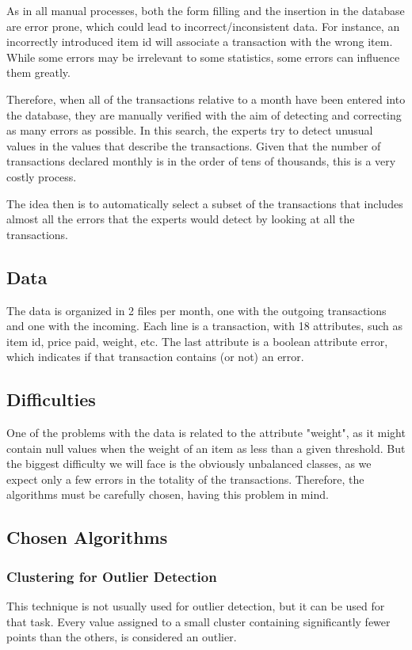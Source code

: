 \documentclass{llncs}
\begin{document}
As in all manual processes, both the form filling and the insertion in the database are error prone, which could lead to incorrect/inconsistent data. For instance, an incorrectly introduced item id will associate a transaction with the wrong item. While some errors may be irrelevant to some statistics, some errors can influence them greatly.

Therefore, when all of the transactions relative to a month have been entered into the database, they are manually verified with the aim of detecting and correcting as many errors as possible. In this search, the experts try to detect unusual values in the values that describe the transactions.
Given that the number of transactions declared monthly is in the order of tens of thousands, this is a very costly process.

The idea then is to automatically select a subset of the transactions that includes almost all the errors that the experts would detect by looking at all the transactions.

\subsection{Data}

The data is organized in 2 files per month, one with the outgoing transactions and one with the incoming. Each line is a transaction, with 18 attributes, such as item id, price paid, weight, etc. The last attribute is a boolean attribute error, which indicates if that transaction contains (or not) an error.

\subsection{Difficulties}

One of the problems with the data is related to the attribute "weight", as it might contain null values when the weight of an item as less than a given threshold. But the biggest difficulty we will face is
the obviously unbalanced classes, as we expect only a few errors in the totality of the transactions. Therefore, the algorithms must be carefully chosen, having this problem in mind.

\subsection{Chosen Algorithms}

\subsubsection{Clustering for Outlier Detection}
This technique is not usually used for outlier detection, but it can be used for that task.
Every value assigned to a small cluster containing significantly fewer points than the others, is considered an outlier.
\end{document}
